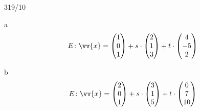 \begin{exercise}{319/10}
  \item [a]
  \begin{gather*}
    E \colon \vv{x} = \begin{pmatrix}1 \\ 0 \\ 1\end{pmatrix} + s \cdot \begin{pmatrix}2 \\ 1 \\ 3\end{pmatrix} + t \cdot \begin{pmatrix}4 \\ -5 \\ 2\end{pmatrix}
  \end{gather*}
  \item [b]
  \begin{gather*}
    E \colon \vv{x} = \begin{pmatrix}2 \\ 0 \\ 1\end{pmatrix} + s \cdot \begin{pmatrix}3 \\ 1 \\ 5\end{pmatrix} + t \cdot \begin{pmatrix}0 \\ 7 \\ 10\end{pmatrix}
  \end{gather*}
\end{exercise}
